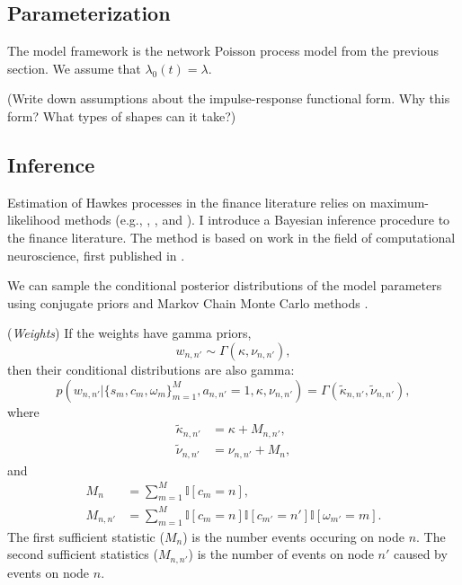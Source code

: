 \subsection{Parameterization}
The model framework is the network Poisson process model from the previous section. We assume that $\lambda_0(t) = \lambda$.

(Write down assumptions about the impulse-response functional form. Why this form? What types of shapes can it take?)


\subsection{Inference}
Estimation of Hawkes processes in the finance literature relies on maximum-likelihood methods (e.g., \cite{Bowsher2007}, \cite{Large2007}, and \cite{Bacry2013}). I introduce a Bayesian inference procedure to the finance literature. The method is based on work in the field of computational neuroscience, first published in \cite{Linderman2015}.

We can sample the conditional posterior distributions of the model parameters using conjugate priors and Markov Chain Monte Carlo methods \cite{}.

(\textit{Weights}) If the weights have gamma priors,
\begin{equation}
	w_{n,n'} \sim \Gamma(\kappa, \nu_{n,n'}),
\end{equation}
then their conditional distributions are also gamma:
\begin{equation}
	p(w_{n,n'} | \{s_m, c_m, \omega_m\}_{m=1}^M, a_{n,n'} = 1, \kappa, \nu_{n,n'}) = \Gamma(\tilde{\kappa}_{n,n'}, \tilde{\nu}_{n,n'}),
\end{equation}
where
\begin{align}
	\tilde{\kappa}_{n,n'} &= \kappa + M_{n,n'}, \\
	\tilde{\nu}_{n,n'} &= \nu_{n,n'} + M_n,
\end{align}
and
\begin{align}
	M_n &= \sum_{m=1}^{M} \mathbb{I}\left[ c_m = n \right], \\
	M_{n,n'} &= \sum_{m=1}^M \mathbb{I}\left[ c_m = n \right] \mathbb{I}\left[ c_{m'} = n' \right] \mathbb{I}\left[ \omega_{m'} = m \right].
\end{align}
The first sufficient statistic ($M_n$) is the number events occuring on node $n$. The second sufficient statistics ($M_{n,n'}$) is the number of events on node $n'$ caused by events on node $n$.

